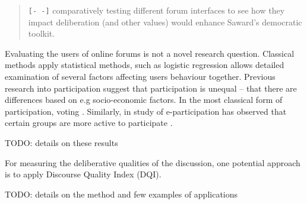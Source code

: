 \documentclass[journal,a4paper]{IEEEtran}
\begin{document}
\begin{quote}
\texttt{[- -]} comparatively testing different forum interfaces to see how they impact deliberation (and other values) would 
enhance Saward’s democratic toolkit.
\end{quote}

Evaluating the users of online forums is not a novel research question. Classical methods apply statistical methods, such as logistic regression allows detailed examination of several factors affecting users behaviour together. Previous research into participation suggest that participation is unequal -- that there are differences based on e.g socio-economic factors. In the most classical form of participation, voting . Similarly, in study of e-participation has observed that certain groups are more active to participate \cite{albrecht06,strandberg08}.

TODO: details on these results

For measuring the deliberative qualities of the discussion, one potential approach is to apply  Discourse Quality Index (DQI).

TODO: details on the method and few examples of applications



\end{document}
